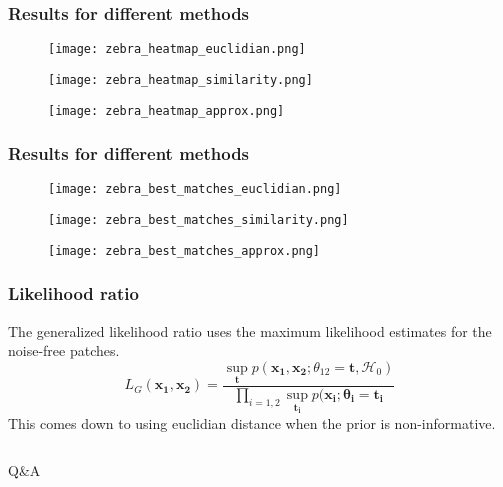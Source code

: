 \documentclass[compress]{beamer} %
\begin{document}
\begin{frame}
\frametitle{Results for different methods}
\begin{figure}
\centering
\begin{minipage}{0.3\linewidth}
\texttt{[image: zebra\_heatmap\_euclidian.png]}
\end{minipage}
\begin{minipage}{0.3\linewidth}
\texttt{[image: zebra\_heatmap\_similarity.png]}
\end{minipage}
\begin{minipage}{0.3\linewidth}
\texttt{[image: zebra\_heatmap\_approx.png]}
\end{minipage}
\end{figure}
\end{frame}

\begin{frame}
\frametitle{Results for different methods}
\begin{figure}
\centering
\begin{minipage}{0.3\linewidth}
\texttt{[image: zebra\_best\_matches\_euclidian.png]}
\end{minipage}
\begin{minipage}{0.3\linewidth}
\texttt{[image: zebra\_best\_matches\_similarity.png]}
\end{minipage}
\begin{minipage}{0.3\linewidth}
\texttt{[image: zebra\_best\_matches\_approx.png]}
\end{minipage}
\end{figure}
\end{frame}

\begin{frame}
\frametitle{Likelihood ratio}
The generalized likelihood ratio uses the maximum likelihood estimates for the noise-free patches.
\[
L_G(\mathbf{x_1},\mathbf{x_2})=\frac{\sup_\mathbf{t}p(\mathbf{x_1},\mathbf{x_2};\theta_{12}=\mathbf{t},\mathcal{H}_0)}{\prod_{i=1,2}\sup_\mathbf{t_i}p(\mathbf{x_i};\mathbf{\theta_i}=\mathbf{t_i}}
\]
This comes down to using euclidian distance when the prior is non-informative.
\end{frame}
  
  \begin{frame}
   {\Huge
     \vspace {0.15\textwidth}
     \begin{columns}
       \begin{column}{0.3\textwidth}
       \end{column}
       \begin{column}{0.3\textwidth}
       \end{column}
       \begin{column}{0.3\textwidth}
       \end{column}
     \end{columns}
   }
   \vspace {0.025\textwidth}
   \begin{center}
   {\huge Q\&A}
   \end{center}
 \end{frame}
  
\end{document}
